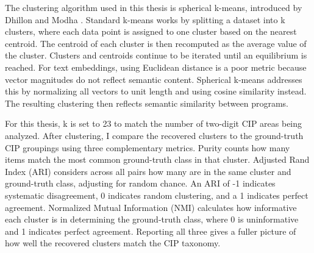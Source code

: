 The clustering algorithm used in this thesis is spherical k-means, introduced by Dhillon and Modha \cite{Dhillon2001ConceptDecompositions}. Standard k-means works by splitting a dataset into k clusters, where each data point is assigned to one cluster based on the nearest centroid. The centroid of each cluster is then recomputed as the average value of the cluster. Clusters and centroids continue to be iterated until an equilibrium is reached. For text embeddings, using Euclidean distance is a poor metric because vector magnitudes do not reflect semantic content. Spherical k-means addresses this by normalizing all vectors to unit length and using cosine similarity instead. The resulting clustering then reflects semantic similarity between programs.

For this thesis, k is set to 23 to match the number of two-digit CIP areas being analyzed. After clustering, I compare the recovered clusters to the ground-truth CIP groupings using three complementary metrics. Purity counts how many items match the most common ground-truth class in that cluster. Adjusted Rand Index (ARI) considers across all pairs how many are in the same cluster and ground-truth class, adjusting for random chance. An ARI of -1 indicates systematic disagreement, 0 indicates random clustering, and a 1 indicates perfect agreement. Normalized Mutual Information (NMI) calculates how informative each cluster is in determining the ground-truth class, where 0 is uninformative and 1 indicates perfect agreement. Reporting all three gives a fuller picture of how well the recovered clusters match the CIP taxonomy.

\newpage
